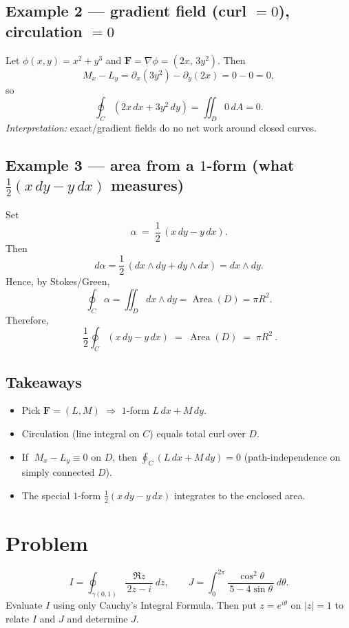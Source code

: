 \documentclass[11pt]{article}
\begin{document}
\subsection*{Example 2 — gradient field (curl $=0$), circulation $=0$}
Let $\phi(x,y)=x^2+y^3$ and $\mathbf F=\nabla\phi=(2x,\,3y^2)$.
Then
\[
M_x - L_y
=
\partial_x(3y^2)-\partial_y(2x)
=
0-0
=
0,
\]
so
\[
\oint_{C} (2x\,dx+3y^2\,dy)
=
\iint_{D} 0\,dA
=
0.
\]
\emph{Interpretation:} exact/gradient fields do no net work around closed curves.

\subsection*{Example 3 — area from a $1$-form (what $\tfrac12(x\,dy-y\,dx)$ measures)}
Set
\[
\alpha \;=\; \frac12\,(x\,dy - y\,dx).
\]
Then
\[
d\alpha
=
\frac12\,(dx\wedge dy + dy\wedge dx)
=
dx\wedge dy.
\]
Hence, by Stokes/Green,
\[
\oint_{C} \alpha
=
\iint_{D} dx\wedge dy
=
\operatorname{Area}(D)
=
\pi R^2.
\]
Therefore,
\[
\boxed{\ \frac12 \oint_{C} (x\,dy - y\,dx)\;=\;\operatorname{Area}(D)\;=\;\pi R^2\ }.
\]

\subsection*{Takeaways}
\begin{itemize}
	\item Pick $\mathbf F=(L,M)$ $\Rightarrow$ $1$-form $L\,dx+M\,dy$.
	\item Circulation (line integral on $C$) equals total curl over $D$.
	\item If $\;M_x-L_y\equiv 0$ on $D$, then $\displaystyle \oint_{C}(L\,dx+M\,dy)=0$ (path-independence on simply connected $D$).
	\item The special $1$-form $\tfrac12(x\,dy - y\,dx)$ integrates to the enclosed area.
\end{itemize}

\section*{Problem}
\[
I=\oint_{\gamma(0,1)} \frac{\Re z}{\,2z - i\,}\,dz,
\qquad
J=\int_{0}^{2\pi} \frac{\cos^{2}\theta}{\,5-4\sin\theta\,}\,d\theta.
\]
Evaluate $I$ using only Cauchy’s Integral Formula. Then put $z=e^{i\theta}$ on $|z|=1$ to relate $I$ and $J$ and determine $J$.
\end{document}

